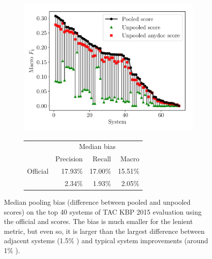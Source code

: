 \begin{figure}[!t]
  \centering
  \begin{subfigure}{\columnwidth}
      \includegraphics[width=0.8\columnwidth]{figures/pooling_bias_f1/pooling_bias/pooling_bias}
    \centering
    \small{\begin{tabular} {l r r r} \toprule
                    & \multicolumn{3}{c}{Median bias} \\
                    & Precision & Recall & Macro \fone{} \\ \midrule 
   Official         & 17.93\% &  17.00\% & 15.51\% \\ 
   \anydoc{}        & 2.34\% &  1.93\% & 2.05\% \\ \bottomrule
   \end{tabular}}
  \end{subfigure}
  \caption[Pooling bias for \fone{} in TAC-KBP 2015]{\label{fig:pooling-bias} Median pooling bias (difference between pooled and unpooled scores) on the top 40 systems of TAC KBP 2015 evaluation using the official and \anydoc{} scores.
  The bias is much smaller for the lenient \anydoc{} metric, but even so, it is larger than the largest difference between adjacent systems (1.5\% \fone{}) and typical system improvements (around 1\% \fone{}).
  }
\end{figure}

